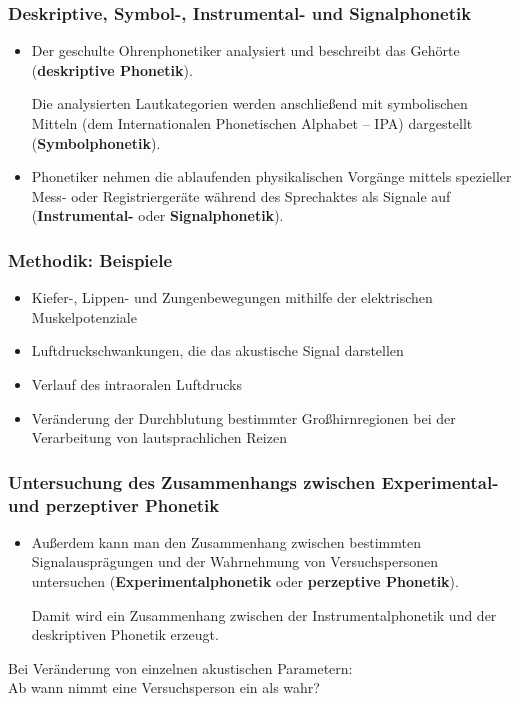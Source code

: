 \begin{frame}
\frametitle{Deskriptive, Symbol-, Instrumental- und Signalphonetik}

	\begin{itemize}
		\item Der geschulte Ohrenphonetiker analysiert und beschreibt das Gehörte
                  (\textbf{deskriptive Phonetik}).

                  Die analysierten Lautkategorien werden anschließend mit symbolischen Mitteln (dem Internationalen Phonetischen Alphabet -- IPA) dargestellt (\textbf{Symbolphonetik}).

		\item Phonetiker nehmen die ablaufenden physikalischen Vorgänge mittels spezieller Mess- oder Registriergeräte während des Sprechaktes als Signale auf (\textbf{Instrumental-} oder \textbf{Signalphonetik}).
	\end{itemize}
	
\end{frame}


\begin{frame}
\frametitle{Methodik: Beispiele}

	\begin{itemize}
\item Kiefer-, Lippen- und Zungenbewegungen mithilfe der elektrischen Muskelpotenziale
\item Luftdruckschwankungen, die das akustische Signal darstellen
\item Verlauf des intraoralen Luftdrucks
\item Veränderung der Durchblutung bestimmter Großhirnregionen bei der Verarbeitung von lautsprachlichen Reizen
	\end{itemize}
	
\end{frame}


\begin{frame}
\frametitle{Untersuchung des Zusammenhangs zwischen Experimental- und perzeptiver Phonetik}

	\begin{itemize}
		\item Außerdem kann man den Zusammenhang zwischen bestimmten Signalausprägungen und
                  der Wahrnehmung von Versuchspersonen untersuchen (\textbf{Experimentalphonetik}
                  oder \textbf{perzeptive Phonetik}).

                  Damit wird ein Zusammenhang zwischen der Instrumentalphonetik und der deskriptiven Phonetik erzeugt.
	\end{itemize}
	
	\ea	Bei Veränderung von einzelnen akustischen Parametern:\\
	Ab wann nimmt eine Versuchsperson ein \textipa{[ da ]} als \textipa{[ ta ]} wahr?
	\z 
	
\end{frame}


